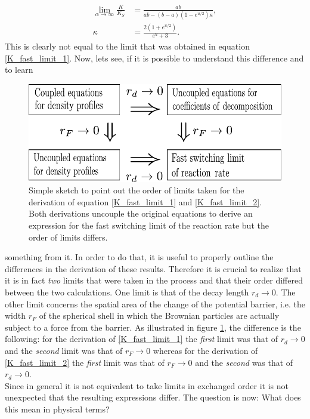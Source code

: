 \begin{align}
    \lim_{\alpha \rightarrow \infty} \frac{K}{K_S} &= \frac{ab}{ab - (b-a)(1-e^{u/2}) \kappa}, \\
    \kappa &= \frac{2(1+e^{u/2})}{e^u + 3}.
    \label{K_fast_limit_2}
\end{align}
This is clearly not equal to the limit that was obtained in equation \eqref{K_fast_limit_1}.
Now, lets see, if it is possible to understand this difference and to learn  \par 
\begin{figure}
    \vspace{-0.2 cm}
    \includegraphics[width = 1 \textwidth]{plots/limits.pdf}
    \caption{Simple sketch to point out the order of limits taken for the derivation of equation \eqref{K_fast_limit_1} and \eqref{K_fast_limit_2}. Both derivations uncouple the original equations to derive an expression for the fast switching limit of the reaction rate but the order of limits differs.}
    \label{sketch_of_limits}
\end{figure}
something from it. In order to do that, it is useful to properly outline the differences in the derivation of these results. Therefore it is crucial to realize that it is in fact \emph{two} limits that were taken in the process and that their order differed between the two calculations. One limit is that of the decay length $r_d \rightarrow 0$. The other limit concerns the spatial area of the change of the potential barrier, i.e. the width $r_F$ of the spherical shell in which the Brownian particles are actually subject to a force from the barrier.
As illustrated in figure \ref{sketch_of_limits}, the difference is the following: for the derivation of \eqref{K_fast_limit_1} the \emph{first} limit was that of $r_d \rightarrow 0$ and the \emph{second} limit was that of $r_F \rightarrow 0$ whereas for the derivation of \eqref{K_fast_limit_2} the \emph{first} limit was that of $r_F \rightarrow 0$ and the \emph{second} was that of $r_d \rightarrow 0$. \\
Since in general it is not equivalent to take limits in exchanged order it is not unexpected that the resulting expressions differ. The question is now: What does this mean in physical terms? \\

